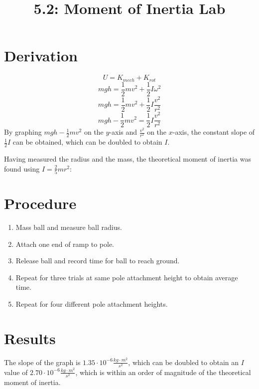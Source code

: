 \documentclass{article}
\title{5.2: Moment of Inertia Lab}
\begin{document}
\section{Derivation}
\[U = K_{mech} + K_{rot}\]
\[mgh = \frac{1}{2}mv^2 + \frac{1}{2}I\omega^2\]
\[mgh = \frac{1}{2}mv^2 + \frac{1}{2}I\frac{v^2}{r^2}\]
\[mgh - \frac{1}{2}mv^2 = \frac{1}{2}I\frac{v^2}{r^2}\]
By graphing $mgh - \frac{1}{2}mv^2$ on the $y$-axis and $\frac{v^2}{r^2}$ on the $x$-axis, the constant slope of $\frac{1}{2}I$ can be obtained, which can be doubled to obtain $I$.

Having measured the radius and the mass, the theoretical moment of inertia was found using $I = \frac{2}{5}mr^2$:
\begin{center}
\end{center}
\section{Procedure}
\begin{enumerate}
    \item Mass ball and measure ball radius.
    \item Attach one end of ramp to pole.
    \item Release ball and record time for ball to reach ground.
    \item Repeat for three trials at same pole attachment height to obtain average time.
    \item Repeat for four different pole attachment heights.
\end{enumerate}
\section{Results}
\begin{figure}[H]
    \centering
\end{figure}
The slope of the graph is $1.35 \cdot 10^{-6} \frac{kg \cdot m^2}{s^2}$, which can be doubled to obtain an $I$ value of $2.70 \cdot 10^{-6} \frac{kg \cdot m^2}{s^2}$, which is within an order of magnitude of the theoretical moment of inertia.
\end{document}
